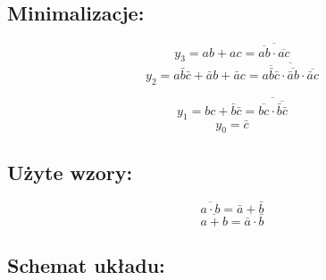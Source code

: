 \documentclass[12pt,a4paper]{article}
\begin{document}
		\subsection{Minimalizacje:}
			
			\begin{minipage}{.5\textwidth}
				\begin{displaymath}
				y_3 = ab + ac = \overline{\overline{ab}\cdot\overline{ac}}
				\end{displaymath}
				\begin{displaymath}
				y_2 = a\bar{b}\bar{c} + \bar{a}b + \bar{a}c
				= \overline{\overline{a\bar{b}\bar{c}}\cdot\overline{\bar{a}b}\cdot\overline{\bar{a}c}}
				\end{displaymath}
			\end{minipage}%
			\begin{minipage}{.5\textwidth}
				\begin{displaymath}
				y_1 = bc + \bar{b}\bar{c}
				= \overline{\overline{bc}\cdot\overline{\bar{b}\bar{c}}}
				\end{displaymath}
				\begin{displaymath}
				y_0 = \bar{c}
				\end{displaymath}
			\end{minipage}
			
		\subsection{Użyte wzory:}
			\begin{equation}
			\overline{a\cdot b}=\bar{a}+\bar{b}
			\end{equation}
			\begin{equation}
			\overline{a+b}=\bar{a}\cdot\bar{b}
			\end{equation}
			
		\subsection{Schemat układu:}
		
\end{document}
